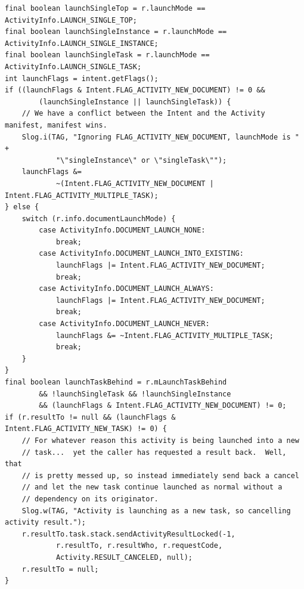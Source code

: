 \documentclass[9pt, b5paaper]{book}
\begin{document}
\begin{verbatim}
final boolean launchSingleTop = r.launchMode == ActivityInfo.LAUNCH_SINGLE_TOP;
final boolean launchSingleInstance = r.launchMode == ActivityInfo.LAUNCH_SINGLE_INSTANCE;
final boolean launchSingleTask = r.launchMode == ActivityInfo.LAUNCH_SINGLE_TASK;
int launchFlags = intent.getFlags();
if ((launchFlags & Intent.FLAG_ACTIVITY_NEW_DOCUMENT) != 0 &&
        (launchSingleInstance || launchSingleTask)) {
    // We have a conflict between the Intent and the Activity manifest, manifest wins.
    Slog.i(TAG, "Ignoring FLAG_ACTIVITY_NEW_DOCUMENT, launchMode is " +
            "\"singleInstance\" or \"singleTask\"");
    launchFlags &=
            ~(Intent.FLAG_ACTIVITY_NEW_DOCUMENT | Intent.FLAG_ACTIVITY_MULTIPLE_TASK);
} else {
    switch (r.info.documentLaunchMode) {
        case ActivityInfo.DOCUMENT_LAUNCH_NONE:
            break;
        case ActivityInfo.DOCUMENT_LAUNCH_INTO_EXISTING:
            launchFlags |= Intent.FLAG_ACTIVITY_NEW_DOCUMENT;
            break;
        case ActivityInfo.DOCUMENT_LAUNCH_ALWAYS:
            launchFlags |= Intent.FLAG_ACTIVITY_NEW_DOCUMENT;
            break;
        case ActivityInfo.DOCUMENT_LAUNCH_NEVER:
            launchFlags &= ~Intent.FLAG_ACTIVITY_MULTIPLE_TASK;
            break;
    }
}
final boolean launchTaskBehind = r.mLaunchTaskBehind
        && !launchSingleTask && !launchSingleInstance
        && (launchFlags & Intent.FLAG_ACTIVITY_NEW_DOCUMENT) != 0;
if (r.resultTo != null && (launchFlags & Intent.FLAG_ACTIVITY_NEW_TASK) != 0) {
    // For whatever reason this activity is being launched into a new
    // task...  yet the caller has requested a result back.  Well, that
    // is pretty messed up, so instead immediately send back a cancel
    // and let the new task continue launched as normal without a
    // dependency on its originator.
    Slog.w(TAG, "Activity is launching as a new task, so cancelling activity result.");
    r.resultTo.task.stack.sendActivityResultLocked(-1,
            r.resultTo, r.resultWho, r.requestCode,
            Activity.RESULT_CANCELED, null);
    r.resultTo = null;
}
\end{verbatim}
\end{document}
